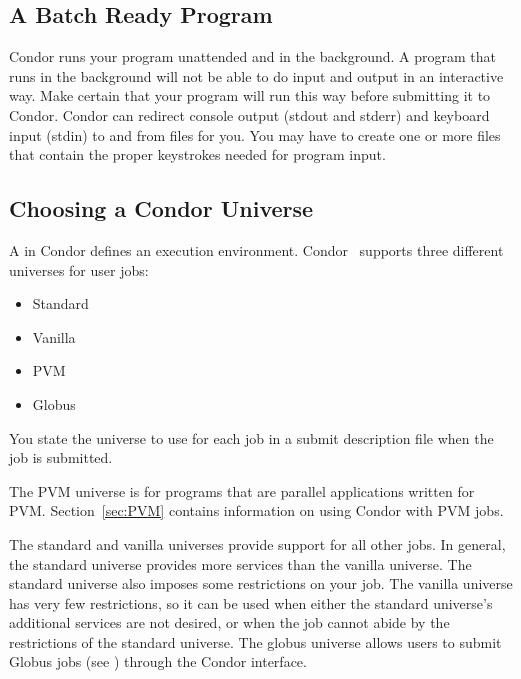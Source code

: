 \subsection{A Batch Ready Program}

Condor runs your program unattended and in the background. 
A program that runs in the background will not be able
to do input and output in an interactive way.
Make certain
that your program will run this way before submitting it to Condor.
Condor can
redirect console output (stdout and stderr) and keyboard input (stdin)
to and from files for you.
You may have to create one or more files that contain
the proper keystrokes needed for program input.

\subsection{\label{sec:Choosing-Universe}
Choosing a Condor Universe}

A  in Condor
defines an execution environment. 
Condor \VersionNotice\ supports three different
universes for user jobs:
\begin{itemize}
	\item Standard
	\item Vanilla
	\item PVM
	\item Globus
\end{itemize}
You state the universe to use for each job in a
submit description file when the job is submitted. 

The PVM universe is for
programs that are parallel applications written for PVM.
Section~\ref{sec:PVM} contains information on using Condor with PVM jobs.

The standard and vanilla universes provide support for all other jobs.
In general, the standard universe provides more services than
the vanilla universe. 
The standard universe also imposes some restrictions on
your job.
The vanilla universe has very few restrictions, so
it can be used when either the standard universe's additional services are not
desired,  or when the job cannot abide by the restrictions
of the standard universe.
The globus universe allows users to submit Globus jobs (see 
) through the Condor interface.

